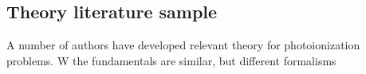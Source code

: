 \subsection{Theory literature sample\label{sec:theory-lit}}

A number of authors have developed relevant theory for photoionization problems. W the fundamentals are similar, but different formalisms 